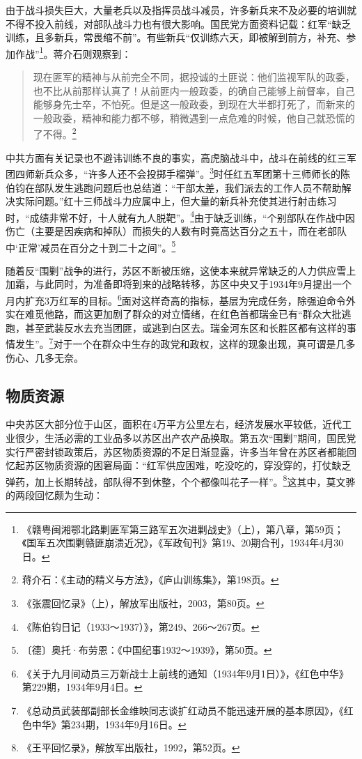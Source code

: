 由于战斗损失巨大，大量老兵以及指挥员战斗减员，许多新兵来不及必要的培训就不得不投入前线，对部队战斗力也有很大影响。国民党方面资料记载：红军“缺乏训练，且多新兵，常畏缩不前”。有些新兵“仅训练六天，即被解到前方，补充、参加作战”\footnote{《赣粤闽湘鄂北路剿匪军第三路军五次进剿战史》（上），第八章，第59页；《国军五次围剿赣匪崩溃近况》，《军政旬刊》第19、20期合刊，1934年4月30日。}。蒋介石则观察到：

\begin{quote}

现在匪军的精神与从前完全不同，据投诚的土匪说：他们监视军队的政委，也不比从前那样认真了！从前匪内一般政委，的确自己能够上前督率，自己能够身先士卒，不怕死。但是这一般政委，到现在大半都打死了，而新来的一般政委，精神和能力都不够，稍微遇到一点危难的时候，他自己就恐慌的了不得。\footnote{蒋介石：《主动的精义与方法》，《庐山训练集》，第198页。}
\end{quote}


中共方面有关记录也不避讳训练不良的事实，高虎脑战斗中，战斗在前线的红三军团四师新兵众多，“许多人还不会投掷手榴弹”。\footnote{《张震回忆录》（上），解放军出版社，2003，第80页。}时任红五军团第十三师师长的陈伯钧在部队发生逃跑问题后也总结道：“干部太差，我们派去的工作人员不帮助解决实际问题。”红十三师战斗力应属中上，但大量的新兵补充使其进行射击练习时，“成绩非常不好，十人就有九人脱靶”。\footnote{《陈伯钧日记（1933～1937）》，第249、266～267页。}由于缺乏训练，“个别部队在作战中因伤亡（主要是因疾病和掉队）而损失的人数有时竟高达百分之五十，而在老部队中‘正常’减员在百分之十到二十之间”。\footnote{〔德〕奥托·布劳恩：《中国纪事1932～1939》，第50页。}


随着反“围剿”战争的进行，苏区不断被压缩，这使本来就异常缺乏的人力供应雪上加霜，与此同时，为准备即将到来的战略转移，苏区中央又于1934年9月提出一个月内扩充3万红军的目标。\footnote{《关于九月间动员三万新战士上前线的通知（1934年9月1日）》，《红色中华》第229期，1934年9月4日。}面对这样奇高的指标，基层为完成任务，除强迫命令外实在难觅他路，而这更加剧了群众的对立情绪，在红色首都瑞金已有“群众大批逃跑，甚至武装反水去充当团匪，或逃到白区去。瑞金河东区和长胜区都有这样的事情发生”。\footnote{《总动员武装部副部长金维映同志谈扩红动员不能迅速开展的基本原因》，《红色中华》第234期，1934年9月16日。}对于一个在群众中生存的政党和政权，这样的现象出现，真可谓是几多伤心、几多无奈。

\subsection{物质资源}


中央苏区大部分位于山区，面积在4万平方公里左右，经济发展水平较低，近代工业很少，生活必需的工业品多以苏区出产农产品换取。第五次“围剿”期间，国民党实行严密封锁政策后，苏区物质资源的不足日渐显露，许多当年曾在苏区者都能回忆起苏区物质资源的困窘局面：“红军供应困难，吃没吃的，穿没穿的，打仗缺乏弹药，加上长期转战，部队得不到休整，个个都像叫花子一样”。\footnote{《王平回忆录》，解放军出版社，1992，第52页。}这其中，莫文骅的两段回忆颇为生动：

